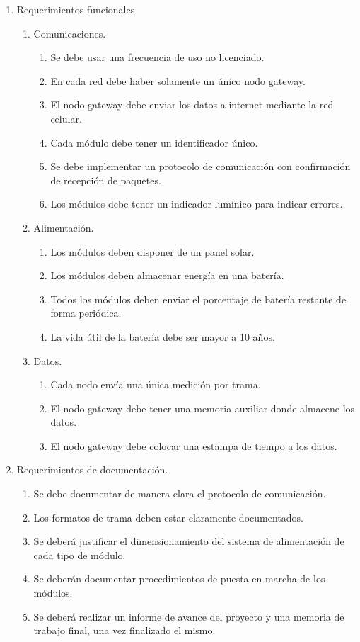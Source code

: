 \documentclass[
11pt, %
codirector, %
]{charter}
\begin{document}
\begin{enumerate}
	\item Requerimientos funcionales
	
		\begin{enumerate}
		
			\item Comunicaciones.
			\begin{enumerate}
				\item Se debe usar una frecuencia de uso no licenciado.
				\item En cada red debe haber solamente un único nodo gateway.
				\item El nodo gateway debe enviar los datos a internet mediante la red celular.
				\item Cada módulo debe tener un identificador único.
				\item Se debe implementar un protocolo de comunicación con confirmación de recepción de paquetes.
				\item Los módulos debe tener un indicador lumínico para indicar errores.
			\end{enumerate}
			
			\item Alimentación.
			\begin{enumerate}
				\item Los módulos deben disponer de un panel solar.
				\item Los módulos deben almacenar energía en una batería.
				\item Todos los módulos deben enviar el porcentaje de batería restante de forma periódica.
				\item La vida útil de la batería debe ser mayor a 10 años.
			\end{enumerate}
			
			\item Datos.
			\begin{enumerate}
				\item Cada nodo envía una única medición por trama.
				\item El nodo gateway debe tener una memoria auxiliar donde almacene los datos.
				\item El nodo gateway debe colocar una estampa de tiempo a los datos.
			\end{enumerate}
			
		\end{enumerate}
	\item Requerimientos de documentación.
		\begin{enumerate}
			\item Se debe documentar de manera clara el protocolo de comunicación.
			\item Los formatos de trama deben estar claramente documentados.
			\item Se deberá justificar el dimensionamiento del sistema de alimentación de cada tipo de módulo.
			\item Se deberán documentar procedimientos de puesta en marcha de los módulos.
			\item Se deberá realizar un informe de avance del proyecto y una memoria de trabajo final, una vez finalizado el mismo.
		\end{enumerate}


\end{enumerate}
\end{document}
